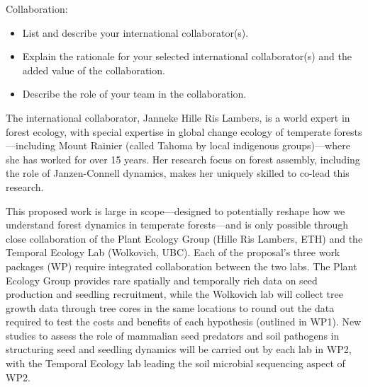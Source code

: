 \documentclass[12pt,oneside]{article}
\newenvironment{smitemize}{
\begin{itemize}
  \setlength{\itemsep}{1pt}
  \setlength{\parskip}{0pt}
  \setlength{\parsep}{0pt}}
{\end{itemize}
}
\begin{document}
{\sc Collaboration:} %
\vspace{-1ex}
\begin{smitemize}
\item List and describe your international collaborator(s).
\item Explain the rationale for your selected international collaborator(s) and the added value of the collaboration.
\item Describe the role of your team in the collaboration.
\end{smitemize}
The international collaborator, Janneke Hille Ris Lambers, is a world expert in forest ecology,\cite{clark1999seed,hille2005implications,ettinger2013climate,hillerislambers2013will,ford2017competition,buckley2019temperate,ford2020soil} with special expertise in global change ecology of temperate forests---including Mount Rainier (called Tahoma by local indigenous groups)---where she has worked for over 15 years.\cite{ettinger2011climate,anderegg2016drought,ford2017competition,ford2020soil} Her research focus on forest assembly, including the role of Janzen-Connell dynamics,\cite{hille2002density} makes her uniquely skilled to co-lead this research. %

This proposed work is large in scope---designed to potentially reshape how we understand forest dynamics in temperate forests---and is only possible through close collaboration of the Plant Ecology Group (Hille Ris Lambers, ETH) and the Temporal Ecology Lab (Wolkovich, UBC). Each of the proposal's three work packages (WP) require integrated collaboration between the two labs. The Plant Ecology Group provides rare spatially and temporally rich data on seed production and seedling recruitment, while the Wolkovich lab will collect tree growth data through tree cores in the same locations to round out the data required to test the costs and benefits of each hypothesis (outlined in WP1). New studies to assess the role of mammalian seed predators and soil pathogens in structuring seed and seedling dynamics will be carried out by each lab in WP2, with the Temporal Ecology lab leading the soil microbial sequencing aspect of WP2. 
\end{document}
